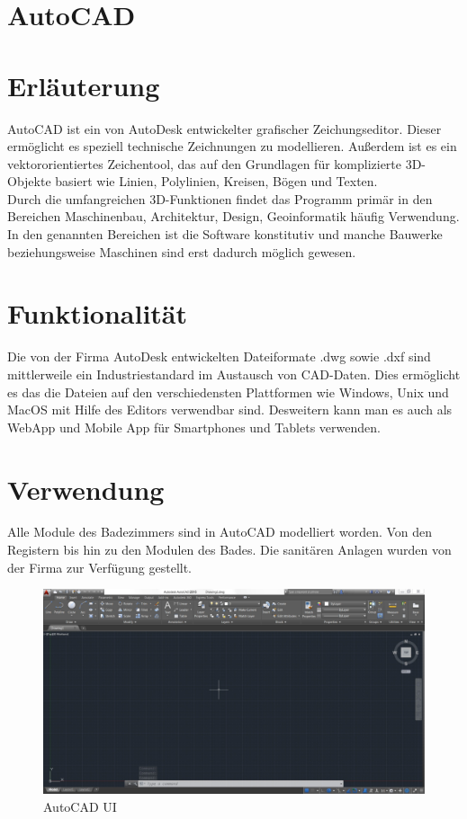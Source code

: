 \clearpage
\newpage

\section{AutoCAD}
\small{\cite{wiki_autocad}}
\section*{Erläuterung}
AutoCAD ist ein von AutoDesk entwickelter grafischer Zeichungseditor. Dieser ermöglicht es speziell technische Zeichnungen zu modellieren. Außerdem ist es ein vektororientiertes Zeichentool, das auf den Grundlagen für komplizierte 3D-Objekte basiert wie Linien, Polylinien, Kreisen, Bögen und Texten.
\\
Durch die umfangreichen 3D-Funktionen findet das Programm primär in den Bereichen Maschinenbau, Architektur, Design, Geoinformatik häufig Verwendung. In den genannten Bereichen ist die Software konstitutiv und manche Bauwerke beziehungsweise Maschinen sind erst dadurch möglich gewesen.

\section*{Funktionalität}
Die von der Firma AutoDesk entwickelten Dateiformate .dwg sowie .dxf sind mittlerweile ein Industriestandard im Austausch von CAD-Daten. Dies ermöglicht es das die Dateien auf den verschiedensten Plattformen wie Windows, Unix und MacOS mit Hilfe des Editors verwendbar sind. Desweitern kann man es auch als WebApp und Mobile App für Smartphones und Tablets verwenden.

\section*{Verwendung}
Alle Module des Badezimmers sind in AutoCAD modelliert worden. Von den Registern bis hin zu den Modulen des Bades. Die sanitären Anlagen wurden von der Firma {\projectpartner} zur Verfügung gestellt.

\begin{figure}[!b]
	\begin{center}
		\includegraphics[width=0.7\linewidth]{images/AutoCAD_UI.jpg}
		\caption{AutoCAD UI ~\cite{autocad}}
	\end{center}
\end{figure}


